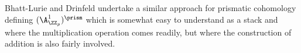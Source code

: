 \begin{remark}
    Bhatt-Lurie \cite{BhattLurieAbsolute} and Drinfeld \cite{DrinfeldPrismatization} undertake a similar approach for prismatic cohomology defining $(\A^{1}_{\ZZ_{p}})^{\prism}$ which is somewhat easy to understand as a stack and where the multiplication operation comes readily, but where the construction of addition is also fairly involved. 
\end{remark}